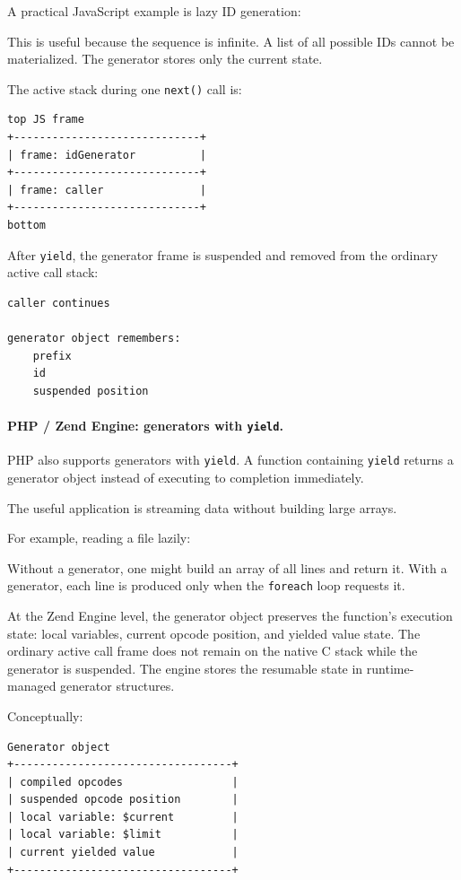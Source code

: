 A practical JavaScript example is lazy ID generation:

This is useful because the sequence is infinite. A list of all possible IDs cannot be materialized. The generator stores only the current state.

The active stack during one \texttt{next()} call is:

\begin{verbatim}
top JS frame
+-----------------------------+
| frame: idGenerator          |
+-----------------------------+
| frame: caller               |
+-----------------------------+
bottom
\end{verbatim}

After \texttt{yield}, the generator frame is suspended and removed from the ordinary active call stack:

\begin{verbatim}
caller continues

generator object remembers:
    prefix
    id
    suspended position
\end{verbatim}

\paragraph{PHP / Zend Engine: generators with \texttt{yield}.}

PHP also supports generators with \texttt{yield}. A function containing \texttt{yield} returns a generator object instead of executing to completion immediately.

The useful application is streaming data without building large arrays.

For example, reading a file lazily:

Without a generator, one might build an array of all lines and return it. With a generator, each line is produced only when the \texttt{foreach} loop requests it.

At the Zend Engine level, the generator object preserves the function's execution state: local variables, current opcode position, and yielded value state. The ordinary active call frame does not remain on the native C stack while the generator is suspended. The engine stores the resumable state in runtime-managed generator structures.

Conceptually:

\begin{verbatim}
Generator object
+----------------------------------+
| compiled opcodes                 |
| suspended opcode position        |
| local variable: $current         |
| local variable: $limit           |
| current yielded value            |
+----------------------------------+
\end{verbatim}

